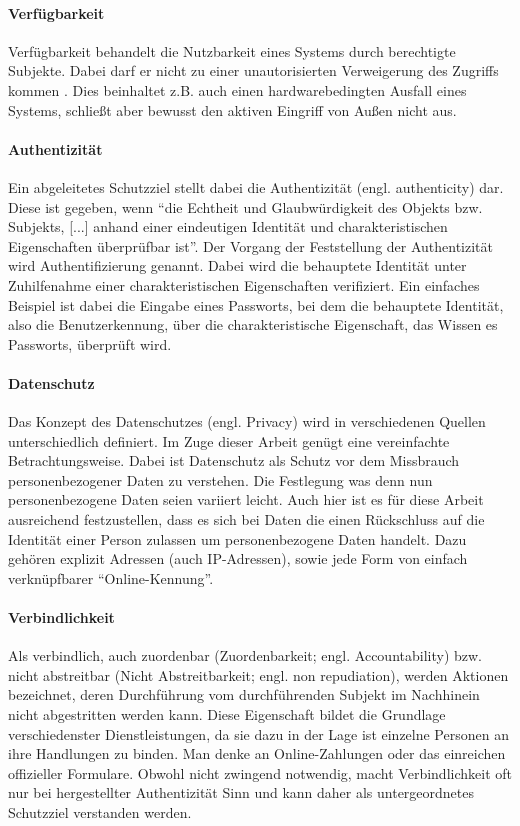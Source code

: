 \paragraph{Verfügbarkeit}
Verfügbarkeit behandelt die Nutzbarkeit eines Systems durch berechtigte Subjekte. Dabei darf er nicht zu einer unautorisierten Verweigerung des Zugriffs kommen \cite[p. 12]{Eckert2013}. Dies beinhaltet z.B. auch einen hardwarebedingten Ausfall eines Systems, schließt aber bewusst den aktiven Eingriff von Außen nicht aus.
 
\paragraph{Authentizität}
Ein abgeleitetes Schutzziel stellt dabei die Authentizität (engl. authenticity) dar. Diese ist gegeben, wenn ``die Echtheit und Glaubwürdigkeit des Objekts bzw. Subjekts, [...] anhand einer eindeutigen Identität und charakteristischen Eigenschaften überprüfbar ist''\cite[p. 8]{Eckert2013}. Der Vorgang der Feststellung der Authentizität wird Authentifizierung genannt. Dabei wird die behauptete Identität unter Zuhilfenahme einer charakteristischen Eigenschaften verifiziert. Ein einfaches Beispiel ist dabei die Eingabe eines Passworts, bei dem die behauptete Identität, also die Benutzerkennung, über die charakteristische Eigenschaft, das Wissen es Passworts, überprüft wird.  

\paragraph{Datenschutz}
Das Konzept des Datenschutzes (engl. Privacy) wird in verschiedenen Quellen unterschiedlich definiert. Im Zuge dieser Arbeit genügt eine vereinfachte Betrachtungsweise. Dabei ist Datenschutz als Schutz vor dem Missbrauch personenbezogener Daten zu verstehen. Die Festlegung was denn nun personenbezogene Daten seien variiert leicht. Auch hier ist es für diese Arbeit ausreichend festzustellen, dass es sich bei Daten die einen Rückschluss auf die Identität einer Person zulassen um personenbezogene Daten handelt. Dazu gehören explizit Adressen (auch IP-Adressen), sowie jede Form von einfach verknüpfbarer ``Online-Kennung''\cite{Schwenke2018}.     

\paragraph{Verbindlichkeit}
Als verbindlich, auch zuordenbar (Zuordenbarkeit; engl. Accountability) bzw. nicht abstreitbar (Nicht Abstreitbarkeit; engl. non repudiation), werden Aktionen bezeichnet, deren Durchführung vom durchführenden Subjekt im Nachhinein nicht abgestritten werden kann. Diese Eigenschaft bildet die Grundlage verschiedenster Dienstleistungen, da sie dazu in der Lage ist einzelne Personen an ihre Handlungen zu binden. Man denke an Online-Zahlungen oder das einreichen offizieller Formulare. Obwohl nicht zwingend notwendig, macht Verbindlichkeit oft nur bei hergestellter Authentizität Sinn und kann daher als untergeordnetes Schutzziel verstanden werden.

